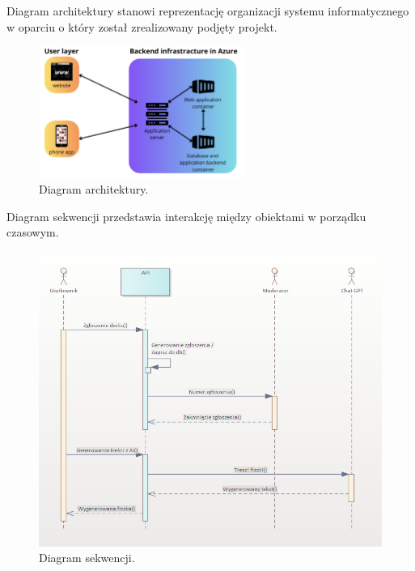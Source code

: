 \indent Diagram architektury stanowi reprezentację organizacji systemu informatycznego w oparciu o który został zrealizowany podjęty projekt.


\begin{figure}[H]
    \centering
    \includegraphics[width=0.6\textwidth]{chapters/chapter_6/diagram_architektury}
    \caption{Diagram architektury.}
    \label{img:diagram_architektury}
\end{figure}


\setlength{\parindent}{15pt}

\indent Diagram sekwencji przedstawia interakcję między obiektami w porządku czasowym.

    \begin{figure}[H]
    \centering
    \includegraphics[width=1\textwidth]{chapters/chapter_6/diagram_sekwencji}
    \caption{Diagram sekwencji.}
    \label{img:diagram_sekwencji}
\end{figure}


    


